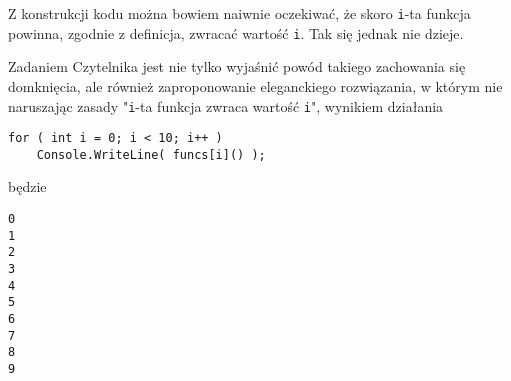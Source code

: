 Z konstrukcji kodu można bowiem naiwnie oczekiwać, że skoro {\tt i}-ta funkcja powinna, zgodnie z definicja, zwracać wartość {\tt i}. Tak się jednak nie dzieje.

Zadaniem Czytelnika jest nie tylko wyjaśnić powód takiego zachowania się domknięcia, ale również zaproponowanie eleganckiego rozwiązania, w którym nie naruszając zasady 
"{\tt i}-ta funkcja zwraca wartość {\tt i}", wynikiem działania 

\begin{scriptsize}
\begin{verbatim}
for ( int i = 0; i < 10; i++ )
    Console.WriteLine( funcs[i]() );
\end{verbatim}
\end{scriptsize}

będzie

\begin{scriptsize}
\begin{verbatim}
0
1
2
3
4
5
6
7
8
9
\end{verbatim}
\end{scriptsize}
	
